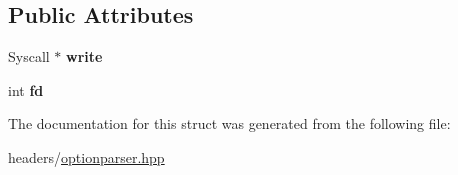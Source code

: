 \subsection*{Public Attributes}
\begin{DoxyCompactItemize}
\item 
\mbox{\label{structoption_1_1PrintUsageImplementation_1_1SyscallWriter_adc72b04cd74c69d0219b8b26589b8e5e}} 
Syscall $\ast$ {\bfseries write}
\item 
\mbox{\label{structoption_1_1PrintUsageImplementation_1_1SyscallWriter_ae79409e3f85f8dbaa7ef87bb8d7fcf8a}} 
int {\bfseries fd}
\end{DoxyCompactItemize}


The documentation for this struct was generated from the following file\+:\begin{DoxyCompactItemize}
\item 
headers/\hyperlink{optionparser_8hpp}{optionparser.\+hpp}\end{DoxyCompactItemize}
